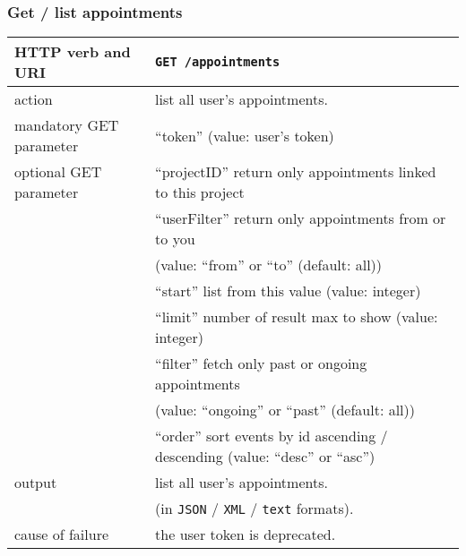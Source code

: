 \subsubsection{Get / list appointments}
\begin{tabular}{ | l | l | }
	\hline
	HTTP verb and URI & \texttt{GET /appointments} \\
	\hline
	action & list all user's appointments. \\
	\hline
	mandatory GET parameter & ``token'' (value: user's token) \\
	\hline
	optional GET parameter & ``projectID'' return only appointments linked to this project \\
	\space & ``userFilter'' return only appointments from or to you \\ 
	\space & (value: ``from'' or ``to'' (default: all)) \\
	\space & ``start'' list from this value (value: integer) \\
	\space & ``limit'' number of result max to show (value: integer) \\
	\space & ``filter'' fetch only past or ongoing appointments \\
	\space & (value: ``ongoing'' or ``past'' (default: all)) \\
	\space & ``order'' sort events by id ascending / descending (value: ``desc'' or ``asc'')  \\
	\hline
	output & list all user's appointments.  \\
	\space & (in \texttt{JSON} / \texttt{XML} / \texttt{text} formats). \\
	\hline
	cause of failure & the user token is deprecated. \\
	\hline
\end{tabular}
\newline


